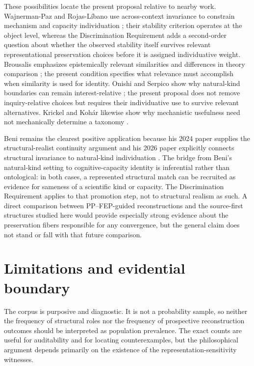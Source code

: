 \documentclass[11pt]{article}
\begin{document}
These possibilities locate the present proposal relative to nearby work. Wajnerman-Paz and Rojas-L\'ibano use across-context invariance to constrain mechanism and capacity individuation \citep{WajnermanPazRojasLibano2026Bidimensional}; their stability criterion operates at the object level, whereas the Discrimination Requirement adds a second-order question about whether the observed stability itself survives relevant representational preservation choices before it is assigned individuative weight. Brousalis emphasizes epistemically relevant similarities and differences in theory comparison \citep{Brousalis2026TheoryComparison}; the present condition specifies what relevance must accomplish when similarity is used for identity. Onishi and Serpico show why natural-kind boundaries can remain interest-relative \citep{OnishiSerpico2022HPC}; the present proposal does not remove inquiry-relative choices but requires their individuative use to survive relevant alternatives. Krickel and Koh\'ar likewise show why mechanistic usefulness need not mechanically determine a taxonomy \citep{Krickel2024CognitiveOntology,Kohar2025ScalingUp}.

Beni remains the clearest positive application because his 2024 paper supplies the structural-realist continuity argument and his 2026 paper explicitly connects structural invariance to natural-kind individuation \citep{Beni2024StructuralRealismFEP,Beni2026KindsWithoutStructure}. The bridge from Beni's natural-kind setting to cognitive-capacity identity is inferential rather than ontological: in both cases, a represented structural match can be recruited as evidence for sameness of a scientific kind or capacity. The Discrimination Requirement applies to that promotion step, not to structural realism as such. A direct comparison between PP--FEP-guided reconstructions and the source-first structures studied here would provide especially strong evidence about the preservation fibers responsible for any convergence, but the general claim does not stand or fall with that future comparison.

\section{Limitations and evidential boundary}

The corpus is purposive and diagnostic. It is not a probability sample, so neither the frequency of structural roles nor the frequency of prospective reconstruction outcomes should be interpreted as population prevalence. The exact counts are useful for auditability and for locating counterexamples, but the philosophical argument depends primarily on the existence of the representation-sensitivity witnesses.
\end{document}
